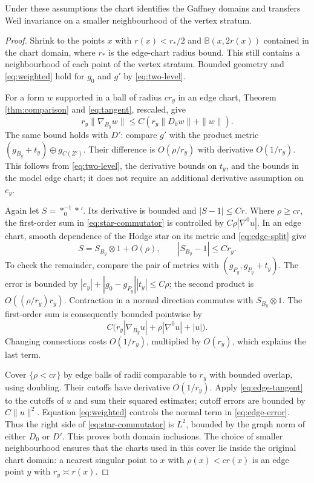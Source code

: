 \begin{theorem}\label{thm:two-level}
Under these assumptions the chart identifies the Gaffney domains
and transfers Weil invariance on a smaller neighbourhood of the
vertex stratum.
\end{theorem}
\begin{proof}
Shrink to the points $x$ with $r(x)<r_*/2$ and
$\mathbb B(x,2r(x))$ contained in the chart domain, where $r_*$
is the edge-chart radius bound. This still contains a neighbourhood
of each point of the vertex stratum. Bounded geometry and
\eqref{eq:weighted} hold for $g_0$ and $g'$ by
\eqref{eq:two-level}.

For a form $w$ supported in a ball of radius $c r_y$ in an edge
chart, Theorem \ref{thm:comparison} and
\eqref{eq:tangent}, rescaled, give
\begin{equation}\label{eq:edge-tangent}
 r_y\|\nabla_{B_y}w\|\le
 C(r_y\|D_0w\|+\|w\|).
\end{equation}
The same bound holds with $D'$: compare $g'$ with the product
metric $(g_{B_y}+t_y)\oplus g_{C(Z')}$.
Their difference is $O(\rho/r_y)$ with derivative $O(1/r_y)$.
This follows from \eqref{eq:two-level}, the derivative bounds
on $t_y$, and the bounds in the model edge chart; it does not
require an additional derivative assumption on $e_y$.

Again let $S=*_{0}^{-1}*'$. Its derivative is bounded and
$|S-1|\le Cr$. Where $\rho\ge c r$, the first-order sum in
\eqref{eq:star-commutator} is controlled by
$C\rho|\nabla^0u|$. In an edge chart, smooth dependence of the
Hodge star on its metric and \eqref{eq:edge-split} give
\begin{equation}\label{eq:base-star}
 S=S_{B_y}\otimes1+O(\rho),\qquad |S_{B_y}-1|\le Cr_y.
\end{equation}
To check the remainder, compare the pair of metrics with
$(g_{P_y},g_{P_y}+t_y)$. The error is bounded by
$|e_y|+|g_0-g_{P_y}||t_y|\le C\rho$; the second product is
$O((\rho/r_y)r_y)$. Contraction in a normal direction commutes
with $S_{B_y}\otimes1$. The first-order sum is consequently
bounded pointwise by
\begin{equation}\label{eq:edge-error}
 C\big(r_y|\nabla_{B_y}u|+\rho|\nabla^0u|+|u|\big).
\end{equation}
Changing connections costs $O(1/r_y)$, multiplied by $O(r_y)$,
which explains the last term.

Cover $\{\rho<cr\}$ by edge balls of radii comparable to $r_y$
with bounded overlap, using doubling. Their cutoffs have derivative
$O(1/r_y)$. Apply \eqref{eq:edge-tangent} to the cutoffs of $u$
and sum their squared estimates; cutoff errors are bounded by
$C\|u\|^2$. Equation \eqref{eq:weighted} controls the normal
term in \eqref{eq:edge-error}. Thus the right side of
\eqref{eq:star-commutator} is $L^2$, bounded by the graph norm
of either $D_0$ or $D'$. This proves both domain inclusions.
The choice of smaller neighbourhood ensures that the charts used
in this cover lie inside the original chart domain: a nearest
singular point to $x$ with $\rho(x)<cr(x)$ is an edge point $y$
with $r_y\asymp r(x)$.


\end{proof}
